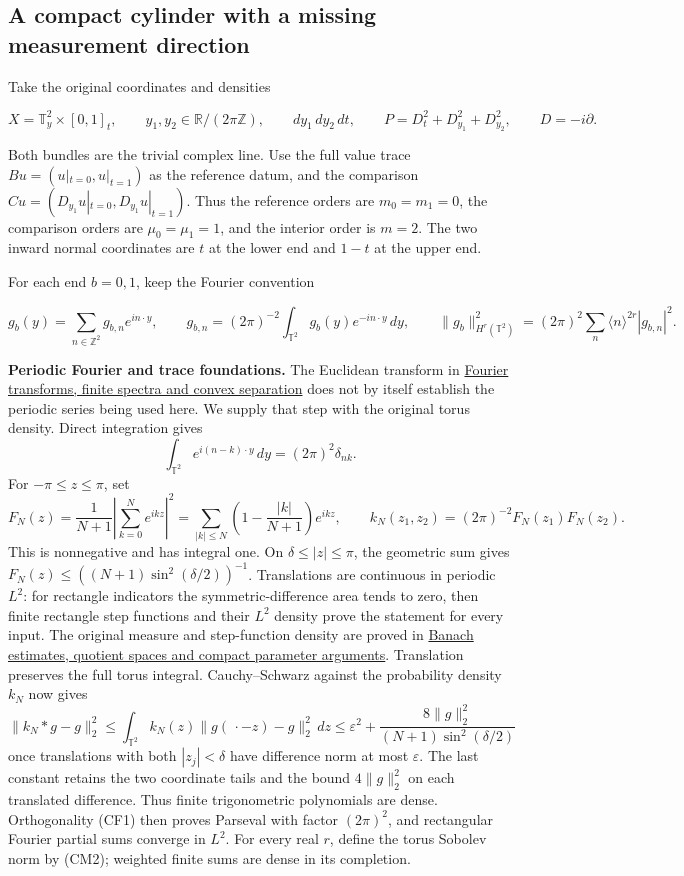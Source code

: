\documentclass[
  11pt,
]{article}
\begin{document}
\subsection{A compact cylinder with a missing measurement
direction}\label{a-compact-cylinder-with-a-missing-measurement-direction}

Take the original coordinates and densities

\[
 X=\mathbb T^2_y\times[0,1]_t,\qquad
 y_1,y_2\in\mathbb R/(2\pi\mathbb Z),\qquad d y_1\,d y_2\,dt,
 \qquad P=D_t^2+D_{y_1}^2+D_{y_2}^2,
 \qquad D=-i\partial.
 \tag{CM1}
\]

Both bundles are the trivial complex line. Use the full value trace
\(Bu=(u|_{t=0},u|_{t=1})\) as the reference datum, and the comparison
\(Cu=(D_{y_1}u|_{t=0},D_{y_1}u|_{t=1})\). Thus the reference orders are
\(m_0=m_1=0\), the comparison orders are \(\mu_0=\mu_1=1\), and the
interior order is \(m=2\). The two inward normal coordinates are \(t\)
at the lower end and \(1-t\) at the upper end.

For each end \(b=0,1\), keep the Fourier convention

\[
 g_b(y)=\sum_{n\in\mathbb Z^2}g_{b,n}e^{i n\cdot y},\qquad
 g_{b,n}=(2\pi)^{-2}\int_{\mathbb T^2}g_b(y)e^{-i n\cdot y}\,dy,
 \qquad
 \|g_b\|_{H^r(\mathbb T^2)}^2
       =(2\pi)^2\sum_n\langle n\rangle^{2r}|g_{b,n}|^2.
 \tag{CM2}
\]

\textbf{Periodic Fourier and trace foundations.} The Euclidean transform
in \href{prerequisite-bridges.pdf}{Fourier transforms, finite spectra and
convex separation} does not by itself establish the periodic series
being used here. We supply that step with the original torus density.
Direct integration gives \[
 \int_{\mathbb T^2}e^{i(n-k)\cdot y}\,dy=(2\pi)^2\delta_{nk}.
 \tag{CF1}
\] For \(-\pi\leq z\leq\pi\), set \[
 F_N(z)=\frac1{N+1}\left|\sum_{k=0}^Ne^{ikz}\right|^2
       =\sum_{|k|\leq N}\left(1-\frac{|k|}{N+1}\right)e^{ikz},
 \qquad k_N(z_1,z_2)=(2\pi)^{-2}F_N(z_1)F_N(z_2).
 \tag{CF2}
\] This is nonnegative and has integral one. On
\(\delta\leq|z|\leq\pi\), the geometric sum gives
\(F_N(z)\leq((N+1)\sin^2(\delta/2))^{-1}\). Translations are continuous
in periodic \(L^2\): for rectangle indicators the symmetric-difference
area tends to zero, then finite rectangle step functions and their
\(L^2\) density prove the statement for every input. The original
measure and step-function density are proved in
\href{banach-foundation-bridges.pdf}{Banach estimates, quotient spaces
and compact parameter arguments}. Translation preserves the full torus
integral. Cauchy--Schwarz against the probability density \(k_N\) now
gives \[
 \|k_N*g-g\|_2^2
 \leq\int_{\mathbb T^2}k_N(z)\|g(\,\cdot-z)-g\|_2^2\,dz
 \leq\varepsilon^2+
       \frac{8\|g\|_2^2}{(N+1)\sin^2(\delta/2)}
 \tag{CF3}
\] once translations with both \(|z_j|<\delta\) have difference norm at
most \(\varepsilon\). The last constant retains the two coordinate tails
and the bound \(4\|g\|_2^2\) on each translated difference. Thus finite
trigonometric polynomials are dense. Orthogonality (CF1) then proves
Parseval with factor \((2\pi)^2\), and rectangular Fourier partial sums
converge in \(L^2\). For every real \(r\), define the torus Sobolev norm
by (CM2); weighted finite sums are dense in its completion.
\end{document}
